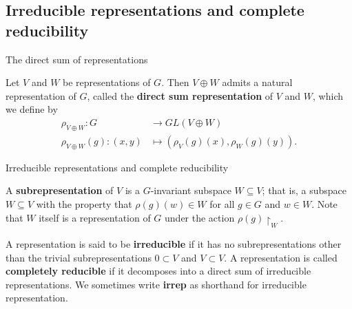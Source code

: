 \subsection{Irreducible representations and complete reducibility}
\begin{frame}{The direct sum of representations}
\begin{definition}
Let $V$ and $W$ be representations of $G$.  Then $V \oplus W$ admits a  natural representation of $G$, called the \textbf{direct sum representation} of $V$ and $W$, which we define by 
\begin{align*}
\rho_{V \oplus W} \colon G &\to GL(V \oplus W) \\
\rho_{V \oplus W}(g) \colon (x,y) &\mapsto (\rho_{V} (g)(x), \rho_{W}(g)(y)).
\end{align*}
\end{definition}
\end{frame}

\begin{frame}{Irreducible representations and complete reducibility}
\begin{definition} A \textbf{subrepresentation} of $V$ is a $G$-invariant subspace $W \subseteq V$; that is, a subspace $W \subseteq V$ with the property that $\rho(g) (w) \in W$ for all $g \in G$ and $w \in W$.  Note that $W$ itself is a representation of $G$ under the action $\rho(g) \restriction_W$.
\end{definition}
\begin{definition}
A representation is said to be \textbf{irreducible} if it has no subrepresentations other than the trivial subrepresentations $ 0 \subset V$ and $V \subset V$.  A representation is called \textbf{completely reducible} if it decomposes into a direct sum of irreducible representations.  We sometimes write \textbf{irrep} as shorthand for irreducible representation.
\end{definition}

\end{frame}

